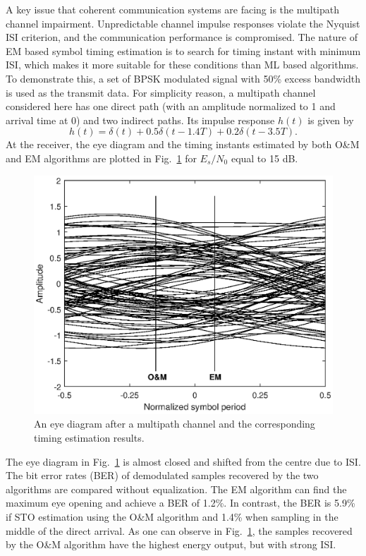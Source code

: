 \documentclass[12pt, draftclsnofoot, onecolumn]{IEEEtran}
\begin{document}
A key issue that coherent communication systems are facing is the multipath channel impairment.
Unpredictable channel impulse responses violate the Nyquist ISI criterion, and the communication performance is compromised.
The nature of EM based symbol timing estimation is to search for timing instant with minimum ISI, which makes it more suitable for these conditions than ML based algorithms.
To demonstrate this, a set of BPSK modulated signal with 50\% excess bandwidth is used as the transmit data.
For simplicity reason, a multipath channel considered here has one direct path (with an amplitude normalized to 1 and arrival time at 0) and two indirect paths.
Its impulse response $h(t)$ is given by
\begin{equation}
h(t)=\delta(t)+0.5\delta(t-1.4T)+0.2\delta(t-3.5T).
\label{eq:multi_path}
\end{equation}
At the receiver, the eye diagram and the timing instants estimated by both O\&M and EM algorithms are plotted in Fig.~\ref{fig:per_timing_isi} for \(E_s/N_0\) equal to 15 dB. 
\begin{figure}[ht]
\centering
\includegraphics[width=3.1 in]{pic/per_timing_multi-k.eps}
\caption{An eye diagram after a multipath channel and the corresponding timing estimation results.}
\label{fig:per_timing_isi} 
\end{figure} 

The eye diagram in Fig.~\ref{fig:per_timing_isi} is almost closed and shifted from the centre due to ISI.
The bit error rates (BER) of demodulated samples recovered by the two algorithms are compared without equalization.
The EM algorithm can find the maximum eye opening and achieve a BER of 1.2\%.
In contrast, the BER is 5.9\% if STO estimation using the O\&M algorithm and 1.4\% when sampling in the middle of the direct arrival.
As one can observe in Fig.~\ref{fig:per_timing_isi}, the samples recovered by the O\&M algorithm have the highest energy output, but with strong ISI.
\end{document}
